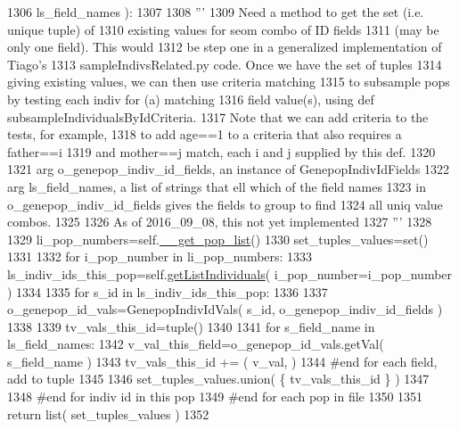 \begin{DoxyCode}
1306                             ls\_field\_names ):
1307 
1308         \textcolor{stringliteral}{'''}
1309 \textcolor{stringliteral}{        Need a method to get the set (i.e. unique tuple) of }
1310 \textcolor{stringliteral}{        existing values for seom combo of ID fields }
1311 \textcolor{stringliteral}{        (may be only one field).  This would }
1312 \textcolor{stringliteral}{        be step one in a generalized implementation of Tiago's }
1313 \textcolor{stringliteral}{        sampleIndivsRelated.py code. Once we have the set of tuples }
1314 \textcolor{stringliteral}{        giving existing values, we can then use criteria matching }
1315 \textcolor{stringliteral}{        to subsample pops by testing each indiv for (a) matching }
1316 \textcolor{stringliteral}{        field value(s), using def subsampleIndividualsByIdCriteria.  }
1317 \textcolor{stringliteral}{        Note that we can add criteria to the tests, for example, }
1318 \textcolor{stringliteral}{        to add age==1 to a criteria that also requires a father==i }
1319 \textcolor{stringliteral}{        and mother==j match, each i and j supplied by this def.}
1320 \textcolor{stringliteral}{}
1321 \textcolor{stringliteral}{        arg o\_genepop\_indiv\_id\_fields, an instance of GenepopIndivIdFields}
1322 \textcolor{stringliteral}{        arg ls\_field\_names, a list of strings that ell which of the field names}
1323 \textcolor{stringliteral}{                in o\_genepop\_indiv\_id\_fields gives the fields to group to find}
1324 \textcolor{stringliteral}{                all uniq value combos.}
1325 \textcolor{stringliteral}{}
1326 \textcolor{stringliteral}{        As of 2016\_09\_08, this not yet implemented}
1327 \textcolor{stringliteral}{        '''}
1328 
1329         li\_pop\_numbers=self.\hyperlink{classnegui_1_1genepopfilemanager_1_1GenepopFileManager_a0cd3178624c652968b4d319f12e5df6e}{\_\_get\_pop\_list}() 
1330         set\_tuples\_values=set()
1331 
1332         \textcolor{keywordflow}{for} i\_pop\_number \textcolor{keywordflow}{in} li\_pop\_numbers:
1333             ls\_indiv\_ids\_this\_pop=self.\hyperlink{classnegui_1_1genepopfilemanager_1_1GenepopFileManager_aa6993dde24163002aeae55005437711d}{getListIndividuals}( i\_pop\_number=i\_pop\_number )
1334 
1335             \textcolor{keywordflow}{for} s\_id \textcolor{keywordflow}{in} ls\_indiv\_ids\_this\_pop:
1336 
1337                 o\_genepop\_id\_vals=GenepopIndivIdVals( s\_id, o\_genepop\_indiv\_id\_fields )
1338 
1339                 tv\_vals\_this\_id=tuple() 
1340 
1341                 \textcolor{keywordflow}{for} s\_field\_name \textcolor{keywordflow}{in} ls\_field\_names:
1342                     v\_val\_this\_field=o\_genepop\_id\_vals.getVal( s\_field\_name )
1343                     tv\_vals\_this\_id += ( v\_val, )
1344                 \textcolor{comment}{#end for each field, add to tuple}
1345 
1346                 set\_tuples\_values.union( \{ tv\_vals\_this\_id \} )
1347 
1348             \textcolor{comment}{#end for indiv id in this pop}
1349         \textcolor{comment}{#end for each pop in file}
1350 
1351         \textcolor{keywordflow}{return} list( set\_tuples\_values )
1352 
\end{DoxyCode}
